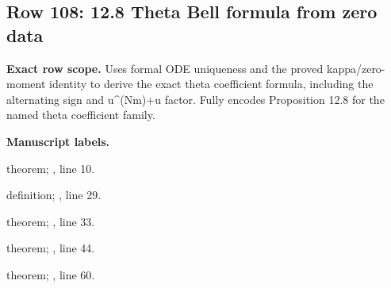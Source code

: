 \subsection{Row 108: 12.8 Theta Bell formula from zero data}
\label{row:108}
\textbf{Exact row scope.} Uses formal ODE uniqueness and the proved kappa/zero-moment identity to derive the exact theta coefficient formula, including the alternating sign and u\textasciicircum{}(Nm)+u factor. Fully encodes Proposition 12.8 for the named theta coefficient family.\par\smallskip
\textbf{Manuscript labels.} \par\smallskip
{\small{}\par}
{\footnotesize\color{muted}theorem; , line 10.\par}\smallskip
{\small{}\par}
{\footnotesize\color{muted}definition; , line 29.\par}\smallskip
{\small{}\par}
{\footnotesize\color{muted}theorem; , line 33.\par}\smallskip
{\small{}\par}
{\footnotesize\color{muted}theorem; , line 44.\par}\smallskip
{\small{}\par}
{\footnotesize\color{muted}theorem; , line 60.\par}\smallskip
{}
